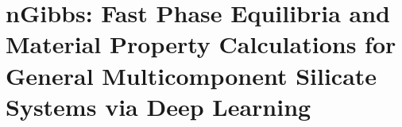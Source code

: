 %
%

\chapter{nGibbs: Fast Phase Equilibria and Material Property Calculations for General Multicomponent Silicate Systems via Deep Learning}
\label{ch:ngibbs}

\begin{quote}
  \itshape
  
\end{quote}





